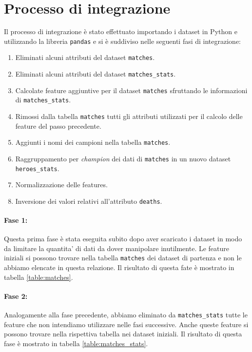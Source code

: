 \documentclass[a4paper,12pt,openany,oneside]{book}
\begin{document}
\section{Processo di integrazione}
Il processo di integrazione è stato effettuato importando i dataset in Python e utilizzando la libreria \verb|pandas| e si è suddiviso nelle seguenti fasi di integrazione:
\begin{enumerate}
	\item Eliminati alcuni attributi del dataset \verb|matches|.
	\item Eliminati alcuni attributi del dataset \verb|matches_stats|.
	\item Calcolate feature aggiuntive per il dataset \verb|matches| sfruttando le informazioni di \verb|matches_stats|.
	\item Rimossi dalla tabella \verb|matches| tutti gli attributi utilizzati per il calcolo delle feature del passo precedente.
	\item Aggiunti i nomi dei campioni nella tabella \verb|matches|.
	\item Raggruppamento per \textit{champion} dei dati di \verb|matches| in un nuovo dataset \verb|heroes_stats|.
	\item Normalizzazione delle features.
	\item Inversione dei valori relativi all'attributo \verb|deaths|.
\end{enumerate}

\paragraph{Fase 1:} Questa prima fase è stata eseguita subito dopo aver scaricato i dataset in modo da limitare la quantita' di dati da dover manipolare inutilmente. Le feature iniziali si possono trovare nella tabella \verb|matches| dei dataset di partenza e non le abbiamo elencate in questa relazione. Il risultato di questa fate è mostrato in tabella \ref{table:matches}.
\paragraph{Fase 2:} Analogamente alla fase precedente, abbiamo eliminato da \verb|matches_stats| tutte le feature che non intendiamo utilizzare nelle fasi successive. Anche queste feature si possono trovare nella rispettiva tabella nei dataset iniziali. Il risultato di questa fase è mostrato in tabella \ref{table:matches_stats}.
\end{document}
